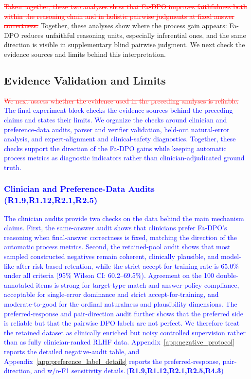 \documentclass[a4paper,fleqn,doubleblind]{cas-sc}
\DeclareRobustCommand{\deleted}[1]{\textcolor{red}{\sout{#1}}}
\DeclareRobustCommand{\added}[1]{\textcolor{blue}{#1}}
\DeclareRobustCommand{\revtag}[1]{\textcolor{blue}{\scriptsize\,(\textbf{#1})}}
\begin{document}
\deleted{Taken together, these two analyses show that Fa-DPO improves faithfulness both within the reasoning chain and in holistic pairwise judgments at fixed answer correctness.}
\noindent Together, these analyses show where the process gain appears: Fa-DPO reduces unfaithful reasoning units, especially inferential ones, and the same direction is visible in supplementary blind pairwise judgment. We next check the evidence sources and limits behind this interpretation.

\subsection{Evidence Validation and Limits}
\label{subsec:evidence_validation}

\deleted{We next assess whether the evidence used in the preceding analyses is reliable.}
\added{The final experiment block checks the evidence sources behind the preceding claims and states their limits. We organize the checks around clinician and preference-data audits, parser and verifier validation, held-out natural-error analysis, and expert-alignment and clinical-safety diagnostics. Together, these checks support the direction of the Fa-DPO gains while keeping automatic process metrics as diagnostic indicators rather than clinician-adjudicated ground truth.}

\subsubsection{\added{Clinician and Preference-Data Audits}\revtag{R1.9,R1.12,R2.1,R2.5}}
\label{subsec:same_answer_clinician_validation}
\label{subsec:negative_audit}
\label{subsec:preference_label_audit}

\added{The clinician audits provide two checks on the data behind the main mechanism claims. First, the same-answer audit shows that clinicians prefer Fa-DPO's reasoning when final-answer correctness is fixed, matching the direction of the automatic process metrics. Second, the retained-pool audit shows that most sampled constructed negatives remain coherent, clinically plausible, and model-like after risk-based retention, while the strict accept-for-training rate is 65.0\% under all criteria (95\% Wilson CI: 60.2--69.5\%). Agreement on the 100 double-annotated items is strong for target-type match and answer-policy compliance, acceptable for single-error dominance and strict accept-for-training, and moderate-to-good for the ordinal naturalness and plausibility dimensions. The preferred-response and pair-direction audit further shows that the preferred side is reliable but that the pairwise DPO labels are not perfect. We therefore treat the retained dataset as clinically enriched but noisy controlled supervision rather than as fully clinician-ranked RLHF data. Appendix~\ref{app:negative_protocol} reports the detailed negative-audit table, and Appendix~\ref{app:preference_label_details} reports the preferred-response, pair-direction, and w/o-F1 sensitivity details.}\revtag{R1.9,R1.12,R2.1,R2.5,R4.3}
\end{document}
